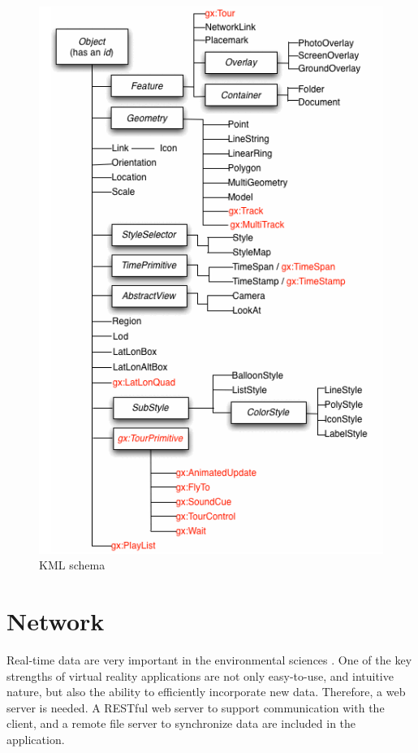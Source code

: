 \begin{figure}[H]
\caption[KML schema]{KML schema \cite{google.kml.2016}}
\label{fig:kml-schema}
\centering
\includegraphics[height=0.7\textheight, keepaspectratio]{Figures/kml-schema.png}
\decoRule
\end{figure}

\section{Network}
\label{section:network}

Real-time data are very important in the environmental sciences \cite{blower.sharing-visualizing.2007}. One of the key strengths of virtual reality applications are not only easy-to-use, and intuitive nature, but also the ability to efficiently incorporate new data.  Therefore, a web server is needed. A RESTful web server to support communication with the client, and a remote file server to synchronize data are included in the application.

